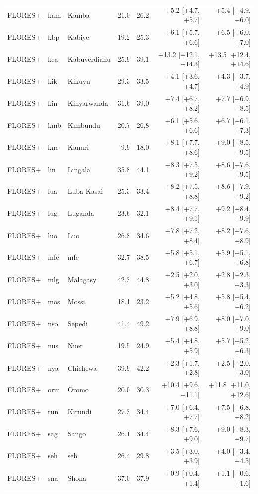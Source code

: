 {\begin{longtable}{@{}lllrrrr@{}}
FLORES+ & kam & Kamba & 21.0 & 26.2 & +5.2 [+4.7, +5.7] & +5.4 [+4.9, +6.0] \\
FLORES+ & kbp & Kabiye & 19.2 & 25.3 & +6.1 [+5.7, +6.6] & +6.5 [+6.0, +7.0] \\
FLORES+ & kea & Kabuverdianu & 25.9 & 39.1 & +13.2 [+12.1, +14.3] & +13.5 [+12.4, +14.6] \\
FLORES+ & kik & Kikuyu & 29.3 & 33.5 & +4.1 [+3.6, +4.7] & +4.3 [+3.7, +4.9] \\
FLORES+ & kin & Kinyarwanda & 31.6 & 39.0 & +7.4 [+6.7, +8.2] & +7.7 [+6.9, +8.5] \\
FLORES+ & kmb & Kimbundu & 20.7 & 26.8 & +6.1 [+5.6, +6.6] & +6.7 [+6.1, +7.3] \\
FLORES+ & knc & Kanuri & 9.9 & 18.0 & +8.1 [+7.7, +8.6] & +9.0 [+8.5, +9.5] \\
FLORES+ & lin & Lingala & 35.8 & 44.1 & +8.3 [+7.5, +9.2] & +8.6 [+7.6, +9.5] \\
FLORES+ & lua & Luba-Kasai & 25.3 & 33.4 & +8.2 [+7.5, +8.8] & +8.6 [+7.9, +9.2] \\
FLORES+ & lug & Luganda & 23.6 & 32.1 & +8.4 [+7.7, +9.1] & +9.2 [+8.4, +9.9] \\
FLORES+ & luo & Luo & 26.8 & 34.6 & +7.8 [+7.2, +8.4] & +8.2 [+7.6, +8.9] \\
FLORES+ & mfe & mfe & 32.7 & 38.5 & +5.8 [+5.1, +6.7] & +5.9 [+5.1, +6.8] \\
FLORES+ & mlg & Malagasy & 42.3 & 44.8 & +2.5 [+2.0, +3.0] & +2.8 [+2.3, +3.3] \\
FLORES+ & mos & Mossi & 18.1 & 23.2 & +5.2 [+4.8, +5.6] & +5.8 [+5.4, +6.2] \\
FLORES+ & nso & Sepedi & 41.4 & 49.2 & +7.9 [+6.9, +8.8] & +8.0 [+7.0, +9.0] \\
FLORES+ & nus & Nuer & 19.5 & 24.9 & +5.4 [+4.8, +5.9] & +5.7 [+5.2, +6.3] \\
FLORES+ & nya & Chichewa & 39.9 & 42.2 & +2.3 [+1.7, +2.8] & +2.5 [+2.0, +3.0] \\
FLORES+ & orm & Oromo & 20.0 & 30.3 & +10.4 [+9.6, +11.1] & +11.8 [+11.0, +12.6] \\
FLORES+ & run & Kirundi & 27.3 & 34.4 & +7.0 [+6.4, +7.7] & +7.5 [+6.8, +8.2] \\
FLORES+ & sag & Sango & 26.1 & 34.4 & +8.3 [+7.6, +9.0] & +9.0 [+8.3, +9.7] \\
FLORES+ & seh & seh & 26.4 & 29.8 & +3.5 [+3.0, +3.9] & +4.0 [+3.4, +4.5] \\
FLORES+ & sna & Shona & 37.0 & 37.9 & +0.9 [+0.4, +1.4] & +1.1 [+0.6, +1.6] \\

\end{longtable}}
